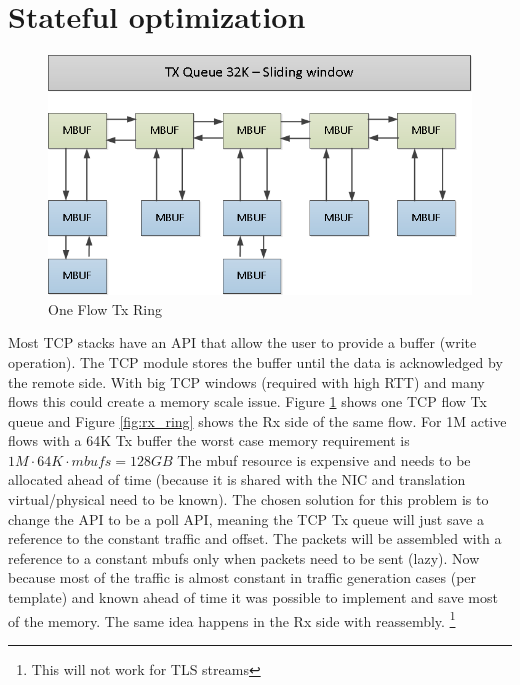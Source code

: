 \documentclass[letterpaper]{article}
\begin{document}

\section{Stateful optimization}

\begin{figure}[h]
\includegraphics[width=0.15
\textwidth, center]{t_c5.png}
\caption{One Flow Tx Ring}
\label{fig:tx_ring}
\end{figure}

Most TCP stacks have an API that allow the user to provide a buffer (write operation). 
The TCP module stores the buffer until the data is acknowledged by the remote side. 
With big TCP windows (required with high RTT) and many flows this could create a memory scale issue. 
Figure \ref{fig:tx_ring} shows one TCP flow Tx queue and Figure \ref{fig:rx_ring} shows the Rx side of the same flow. For 1M active flows with a 64K Tx buffer 
the worst case memory requirement is $1M \cdot 64K \cdot  mbufs  = 128GB$
The mbuf resource is expensive and needs to be allocated ahead of time (because it is shared with the NIC and translation virtual/physical need to be known). 
The chosen solution for this problem is to change the API to be a poll API, 
meaning the TCP Tx queue will just save a reference to the constant traffic and offset. The packets will be assembled with a reference to a constant mbufs only when packets need to be sent (lazy). 
Now because most of the traffic is almost constant in traffic generation cases (per template) and known ahead of time it was possible to implement and save most of the memory.
The same idea happens in the Rx side with reassembly. \footnote{This will not work for TLS streams}
\end{document}
